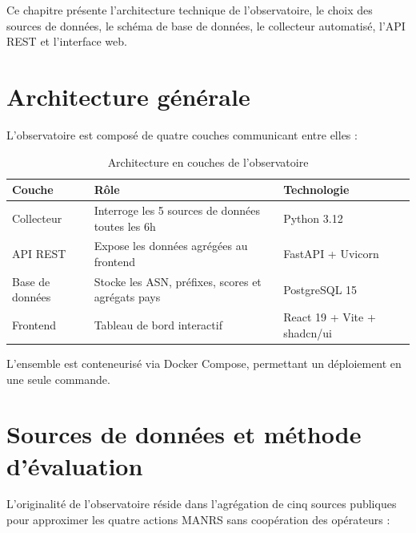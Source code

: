 \documentclass{eneam}
\begin{document}
Ce chapitre présente l'architecture technique de l'observatoire, le choix des sources de données, le schéma de base de données, le collecteur automatisé, l'API REST et l'interface web.

\section{Architecture générale}

L'observatoire est composé de quatre couches communicant entre elles :

\begin{table}[H]
\caption{Architecture en couches de l'observatoire}
\centering
\begin{tabularx}{\textwidth}{|l|X|l|}
\hline
\textbf{Couche} & \textbf{Rôle} & \textbf{Technologie} \\
\hline
Collecteur & Interroge les 5 sources de données toutes les 6h & Python 3.12 \\
\hline
API REST & Expose les données agrégées au frontend & FastAPI + Uvicorn \\
\hline
Base de données & Stocke les ASN, préfixes, scores et agrégats pays & PostgreSQL 15 \\
\hline
Frontend & Tableau de bord interactif & React 19 + Vite + shadcn/ui \\
\hline
\end{tabularx}
\end{table}

L'ensemble est conteneurisé via Docker Compose, permettant un déploiement en une seule commande.

\section{Sources de données et méthode d'évaluation}

L'originalité de l'observatoire réside dans l'agrégation de cinq sources publiques pour approximer les quatre actions MANRS sans coopération des opérateurs :
\end{document}
